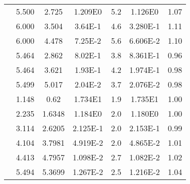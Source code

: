 \begin{table}[htp]
\begin{tabular}{
   !{\vrule width 1pt}
  c!{\vrule width 1pt}
  c!{\vrule width 1pt}
  c!{\vrule width 1pt}
  c!{\vrule width 1pt}
  c!{\vrule width 1pt}
  c!{\vrule width 1pt}
  c!{\vrule width 1pt}
  }
& 5.500  & 2.725  &1.209E0  & 5.2  &1.126E0   & 1.07 \\ \hhline{|~|------|}
& 6.000  & 3.504  &3.64E-1  & 4.6  &3.280E-1   & 1.11 \\ \hhline{|~|------|}
{}& 6.000  & 4.478  &7.25E-2  & 5.6  &6.606E-2   & 1.10 \\ \midrule[2pt]
& 5.464  & 2.862  &8.02E-1  & 3.8  &8.361E-1   & 0.96 \\ \hhline{|~|------|}
& 5.464  & 3.621  &1.93E-1  & 4.2  &1.974E-1   & 0.98  \\ \hhline{|~|------|}
{}& 5.499  & 5.017  &2.04E-2  & 3.7  &2.076E-2   & 0.98 \\ \midrule[2pt]
& 1.148  & 0.62   &1.734E1  & 1.9     &1.735E1   & 1.00 \\\hhline{|~|------|}
& 2.235  & 1.6348 &1.184E0  & 2.0     &1.180E0    & 1.00 \\ \hhline{|~|------|}
& 3.114  & 2.6205 &2.125E-1 & 2.0     &2.153E-1  & 0.99 \\ \hhline{|~|------|}
& 4.104  & 3.7981 &4.919E-2 & 2.0     &4.865E-2  & 1.01  \\ \hhline{|~|------|}
& 4.413  & 4.7957 &1.098E-2 & 2.7     &1.082E-2  & 1.02  \\\hhline{|~|------|}
& 5.494  & 5.3699 &1.267E-2 & 2.5     &1.216E-2  & 1.04  \\ \bottomrule[2pt]
\end{tabular}
 \end{table}

